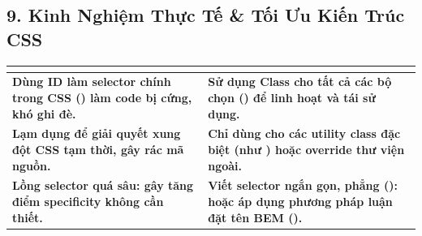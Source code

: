 \subsection{9. Kinh Nghiệm Thực Tế \& Tối Ưu Kiến Trúc CSS}

\begin{prettyTableBox}
\sffamily\small
\begin{tabularx}{\linewidth}{|>{\bfseries\color{red!80!black}}Z|>{\bfseries\color{green!60!black}}Z|}
\hline
{}  &  \\
\hline
Dùng ID làm selector chính trong CSS () làm code bị cứng, khó ghi đè. & Sử dụng Class cho tất cả các bộ chọn () để linh hoạt và tái sử dụng. \\
\hline
Lạm dụng  để giải quyết xung đột CSS tạm thời, gây rác mã nguồn. & Chỉ dùng  cho các utility class đặc biệt (như ) hoặc override thư viện ngoài. \\
\hline
Lồng selector quá sâu:  gây tăng điểm specificity không cần thiết. & Viết selector ngắn gọn, phẳng ():  hoặc áp dụng phương pháp luận đặt tên BEM (). \\
\hline
\end{tabularx}
\end{prettyTableBox}

